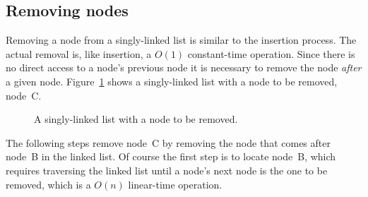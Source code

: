 \documentclass{article}
\begin{document}
  \subsection{Removing nodes}
  Removing a node from a singly-linked list is similar to the insertion process. The actual removal is, like insertion, a $O(1)$ constant-time operation. Since there is no direct access to a node's previous node it is necessary to remove the node \emph{after} a given node.
  Figure~\ref{fig:singlelinkedlist-beforeremove} shows a singly-linked list with a node to be removed, node~C.
  \begin{figure}[H]
    \centering
    \caption{A singly-linked list with a node to be removed.}
    \label{fig:singlelinkedlist-beforeremove}
  \end{figure}

  The following steps remove node~C by removing the node that comes after node~B in the linked list. Of course the first step is to locate node~B, which requires traversing the linked list until a node's next node is the one to be removed, which is a $O(n)$ linear-time operation.
\end{document}
